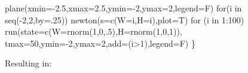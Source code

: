 \documentclass[
  a4paper,
  DIV=11,
  numbers=noendperiod]{scrreprt}
\newenvironment{Shaded}{\begin{snugshade}}{\end{snugshade}}
\newcommand{\AttributeTok}[1]{\textcolor[rgb]{0.40,0.45,0.13}{#1}}
\newcommand{\ControlFlowTok}[1]{\textcolor[rgb]{0.00,0.23,0.31}{#1}}
\newcommand{\DecValTok}[1]{\textcolor[rgb]{0.68,0.00,0.00}{#1}}
\newcommand{\FloatTok}[1]{\textcolor[rgb]{0.68,0.00,0.00}{#1}}
\newcommand{\FunctionTok}[1]{\textcolor[rgb]{0.28,0.35,0.67}{#1}}
\newcommand{\NormalTok}[1]{\textcolor[rgb]{0.00,0.23,0.31}{#1}}
\newcommand{\SpecialCharTok}[1]{\textcolor[rgb]{0.37,0.37,0.37}{#1}}
\begin{document}
\begin{Shaded}
\begin{Highlighting}[]
\FunctionTok{plane}\NormalTok{(}\AttributeTok{xmin=}\SpecialCharTok{{-}}\FloatTok{2.5}\NormalTok{,}\AttributeTok{xmax=}\FloatTok{2.5}\NormalTok{,}\AttributeTok{ymin=}\SpecialCharTok{{-}}\DecValTok{2}\NormalTok{,}\AttributeTok{ymax=}\DecValTok{2}\NormalTok{,}\AttributeTok{legend=}\NormalTok{F)}
\ControlFlowTok{for}\NormalTok{(i }\ControlFlowTok{in} \FunctionTok{seq}\NormalTok{(}\SpecialCharTok{{-}}\DecValTok{2}\NormalTok{,}\DecValTok{2}\NormalTok{,}\AttributeTok{by=}\NormalTok{.}\DecValTok{25}\NormalTok{)) }\FunctionTok{newton}\NormalTok{(}\AttributeTok{s=}\FunctionTok{c}\NormalTok{(}\AttributeTok{W=}\NormalTok{i,}\AttributeTok{H=}\NormalTok{i),}\AttributeTok{plot=}\NormalTok{T)}
\ControlFlowTok{for}\NormalTok{ (i }\ControlFlowTok{in} \DecValTok{1}\SpecialCharTok{:}\DecValTok{100}\NormalTok{)}
  \FunctionTok{run}\NormalTok{(}\AttributeTok{state=}\FunctionTok{c}\NormalTok{(}\AttributeTok{W=}\FunctionTok{rnorm}\NormalTok{(}\DecValTok{1}\NormalTok{,}\DecValTok{0}\NormalTok{,.}\DecValTok{5}\NormalTok{),}\AttributeTok{H=}\FunctionTok{rnorm}\NormalTok{(}\DecValTok{1}\NormalTok{,}\DecValTok{0}\NormalTok{,}\DecValTok{1}\NormalTok{)), }\AttributeTok{tmax=}\DecValTok{50}\NormalTok{,}\AttributeTok{ymin=}\SpecialCharTok{{-}}\DecValTok{2}\NormalTok{,}\AttributeTok{ymax=}\DecValTok{2}\NormalTok{,}\AttributeTok{add=}\NormalTok{(i}\SpecialCharTok{\textgreater{}}\DecValTok{1}\NormalTok{),}\AttributeTok{legend=}\NormalTok{F)}
\NormalTok{\}}
\end{Highlighting}
\end{Shaded}

Resulting in:
\end{document}
